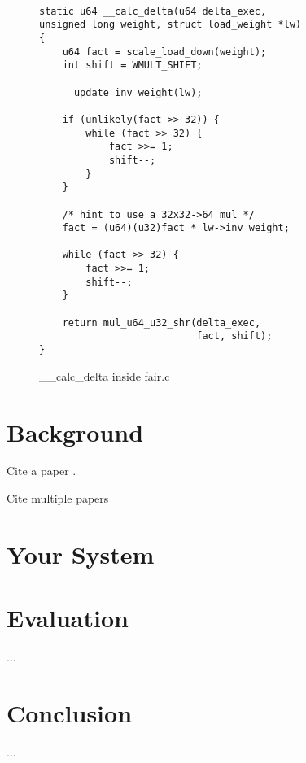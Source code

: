 \documentclass[10pt, conference]{IEEEtran}
\begin{document}
\begin{figure}[h]
\lstset{language=c}
\lstset{basicstyle=\small}
\begin{lstlisting}

static u64 __calc_delta(u64 delta_exec, 
unsigned long weight, struct load_weight *lw)
{
	u64 fact = scale_load_down(weight);
	int shift = WMULT_SHIFT;

	__update_inv_weight(lw);
	
	if (unlikely(fact >> 32)) {
		while (fact >> 32) {
			fact >>= 1;
			shift--;
		}
	}
	
	/* hint to use a 32x32->64 mul */
	fact = (u64)(u32)fact * lw->inv_weight;
	
	while (fact >> 32) {
		fact >>= 1;
		shift--;
	}
	
	return mul_u64_u32_shr(delta_exec, 
	                       fact, shift);
}

\end{lstlisting}
\caption{\_\_calc\_delta inside fair.c}
\end{figure}


\section{Background}
Cite a paper \cite{barroso2009datacenter}.

Cite multiple papers \cite{banga99resourcecontainers,barroso2009datacenter}

\section{Your System}



\section{Evaluation}
...
\section{Conclusion}
...



\end{document}
